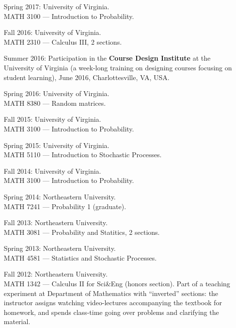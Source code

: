 \documentclass[letterpaper,11pt]{article}
\begin{document}
\begin{itemize}
	\item
	      [Spring 2017:]
	      University of Virginia. \\
	      MATH 3100 --- Introduction to Probability.

	\item
	      [Fall 2016:]
	      University of Virginia. \\
	      MATH 2310 --- Calculus III, 2 sections.

	\item
	      [Summer 2016:] Participation in the \textbf{Course Design
		      Institute} at
	      the University of Virginia (a week-long training on designing
	      courses focusing
	      on student learning), June 2016, Charlottesville, VA, USA.

	\item
	      [Spring 2016:]
	      University of Virginia. \\
	      MATH 8380 --- Random matrices.

	\item
	      [Fall 2015:]
	      University of Virginia. \\
	      MATH 3100 --- Introduction to Probability.

	\item
	      [Spring 2015:]
	      University of Virginia. \\
	      MATH 5110 --- Introduction to Stochastic Processes.

	\item
	      [Fall 2014:]
	      University of Virginia. \\
	      MATH 3100 --- Introduction to Probability.

	\item
	      [Spring 2014:]
	      Northeastern University. \\
	      MATH 7241 ---
	      Probability 1 (graduate).

	\item
	      [Fall 2013:]
	      Northeastern University. \\
	      MATH 3081 ---
	      Probability and Statitics, 2 sections.
	\item
	      [Spring 2013:]
	      Northeastern University.
	      \\
	      MATH 4581 --- Statistics and Stochastic Processes.
	\item
	      [Fall 2012:]
	      Northeastern University.
	      \\
	      MATH 1342 --- Calculus II for Sci\&Eng (honors section). Part of
	      a
	      teaching experiment at Department of Mathematics with
	      ``inverted''
	      sections: the instructor assigns watching video-lectures
	      accompanying
	      the textbook for homework, and spends class-time going over
	      problems
	      and clarifying the material.


\end{itemize}
\end{document}
